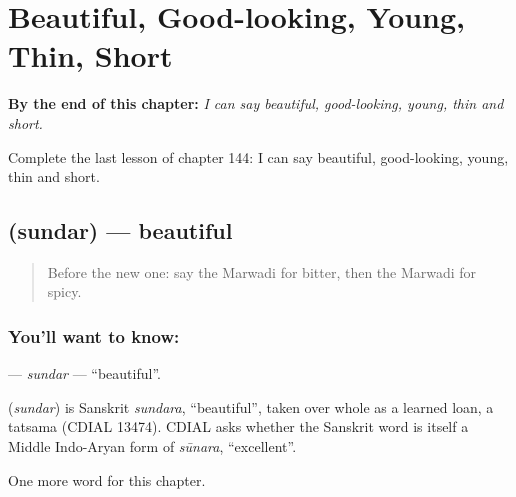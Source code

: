 
\chapter{Beautiful, Good-looking, Young, Thin, Short}
\label{ch:mw-beautiful-good-looking-young-thin-short}

\begin{chapteropening}
\textbf{By the end of this chapter:} \emph{I can say beautiful, good-looking, young, thin and short.}

Complete the last lesson of chapter 144: I can say beautiful, good-looking, young, thin and short.
\end{chapteropening}

\section[\texorpdfstring{\mw{सुंदर} (sundar)}{सुंदर (sundar)}]{ (sundar) — beautiful}

\label{lesson:MW-C144-sundar}



\begin{quote}
Before the new one: say the Marwadi for bitter, then the Marwadi for spicy.
\end{quote}

\subsection*{You'll want to know: }
\textbf{} — \emph{sundar} — \textquotedblleft{}beautiful\textquotedblright{}.

\begin{cousinweb}
\textbf{} (\emph{sundar}) is Sanskrit \emph{sundara}, \textquotedblleft{}beautiful\textquotedblright{}, taken over whole as a learned loan, a tatsama (CDIAL 13474). CDIAL asks whether the Sanskrit word is itself a Middle Indo-Aryan form of \emph{sūnara}, \textquotedblleft{}excellent\textquotedblright{}.
\end{cousinweb}

\begin{grammarlens}[title={What you've built}]
One more word for this chapter.
\end{grammarlens}

